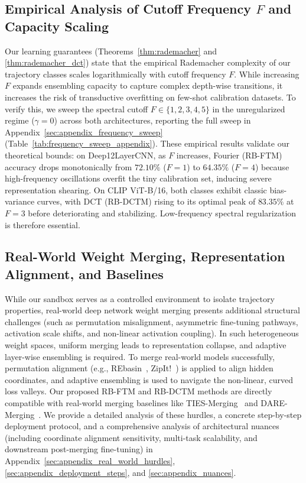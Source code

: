 \subsection{Empirical Analysis of Cutoff Frequency $F$ and Capacity Scaling}
Our learning guarantees (Theorems~\ref{thm:rademacher} and \ref{thm:rademacher_dct}) state that the empirical Rademacher complexity of our trajectory classes scales logarithmically with cutoff frequency $F$. While increasing $F$ expands ensembling capacity to capture complex depth-wise transitions, it increases the risk of transductive overfitting on few-shot calibration datasets. To verify this, we sweep the spectral cutoff $F \in \{1, 2, 3, 4, 5\}$ in the unregularized regime ($\gamma = 0$) across both architectures, reporting the full sweep in Appendix~\ref{sec:appendix_frequency_sweep} (Table~\ref{tab:frequency_sweep_appendix}). These empirical results validate our theoretical bounds: on Deep12LayerCNN, as $F$ increases, Fourier (RB-FTM) accuracy drops monotonically from $72.10\%$ ($F=1$) to $64.35\%$ ($F=4$) because high-frequency oscillations overfit the tiny calibration set, inducing severe representation shearing. On CLIP ViT-B/16, both classes exhibit classic bias-variance curves, with DCT (RB-DCTM) rising to its optimal peak of $83.35\%$ at $F=3$ before deteriorating and stabilizing. Low-frequency spectral regularization is therefore essential.

\subsection{Real-World Weight Merging, Representation Alignment, and Baselines}
While our sandbox serves as a controlled environment to isolate trajectory properties, real-world deep network weight merging presents additional structural challenges (such as permutation misalignment, asymmetric fine-tuning pathways, activation scale shifts, and non-linear activation coupling). In such heterogeneous weight spaces, uniform merging leads to representation collapse, and adaptive layer-wise ensembling is required. To merge real-world models successfully, permutation alignment (e.g., REbasin~\cite{ainsworth2022git}, ZipIt!~\cite{stoica2023zipit}) is applied to align hidden coordinates, and adaptive ensembling is used to navigate the non-linear, curved loss valleys. Our proposed RB-FTM and RB-DCTM methods are directly compatible with real-world merging baselines like TIES-Merging~\cite{yadav23ties} and DARE-Merging~\cite{yu23dare}. We provide a detailed analysis of these hurdles, a concrete step-by-step deployment protocol, and a comprehensive analysis of architectural nuances (including coordinate alignment sensitivity, multi-task scalability, and downstream post-merging fine-tuning) in Appendix~\ref{sec:appendix_real_world_hurdles}, \ref{sec:appendix_deployment_steps}, and \ref{sec:appendix_nuances}.

